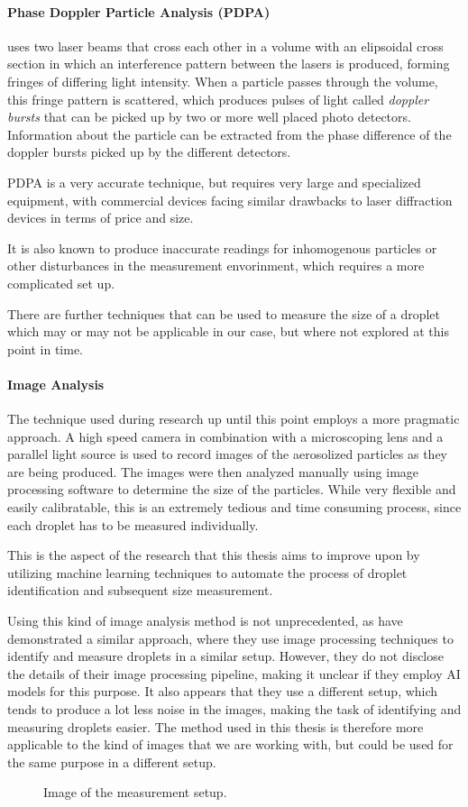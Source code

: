 \paragraph{Phase Doppler Particle Analysis (PDPA)} uses two laser beams that cross each other in a volume with an elipsoidal cross section in which an interference pattern between the lasers is produced, forming fringes of differing light intensity. \cite{hollPARTICLEDEPOSITIONVELOCITIES}
When a particle passes through the volume, this fringe pattern is scattered, which produces pulses of light called \emph{doppler bursts} that can be picked up by two or more well placed photo detectors.
Information about the particle can be extracted from the phase difference of the doppler bursts picked up by the different detectors.

PDPA is a very accurate technique, but requires very large and specialized equipment, with commercial devices facing similar drawbacks to laser diffraction devices in terms of price and size.

It is also known to produce inaccurate readings for inhomogenous particles or other disturbances in the measurement envorinment, which requires a more complicated set up.

There are further techniques that can be used to measure the size of a droplet which may or may not be applicable in our case, but where not explored at this point in time. 

\paragraph{Image Analysis} 
The technique used during research up until this point employs a more pragmatic approach. A high speed camera in combination with a microscoping lens and a parallel light source is used to record images of the aerosolized particles as they are being produced. The images were then analyzed manually using image processing software to determine the size of the particles. While very flexible and easily calibratable, this is an extremely tedious and time consuming process, since each droplet has to be measured individually.

This is the aspect of the research that this thesis aims to improve upon by utilizing machine learning techniques to automate the process of droplet identification and subsequent size measurement.

Using this kind of image analysis method is not unprecedented, as \cite{sijsDropSizeMeasurement2021} have demonstrated a similar approach, where they use image processing techniques to identify and measure droplets in a similar setup. 
However, they do not disclose the details of their image processing pipeline, making it unclear if they employ AI models for this purpose. 
It also appears that they use a different setup, which tends to produce a lot less noise in the images, making the task of identifying and measuring droplets easier.
The method used in this thesis is therefore more applicable to the kind of images that we are working with, but could be used for the same purpose in a different setup.

\begin{figure}[htbp]
    \centering
    \caption{Image of the measurement setup.}
    \label{fig:setup}
\end{figure}
